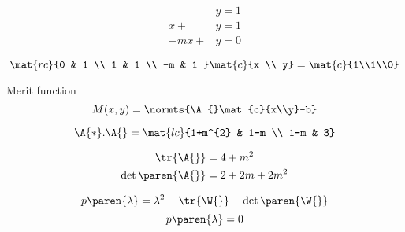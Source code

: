   \begin{equation*}   %
    \begin{split}
      &y = 1 \\
      x + &y = 1 \\
      -mx +&y = 0
    \end{split}
  \end{equation*}

  \begin{equation*}   %
      \mat{rc}{0 & 1 \\ 1 & 1 \\ -m & 1 } 
      \mat{c}{x \\ y} = 
      \mat{c}{1\\1\\0}
  \end{equation*}

Merit function
  \begin{equation*}   %
      M(x,y) = \normts{\A{}\mat{c}{x\\y}-b}
  \end{equation*}

  \begin{equation*}   %
      \A{*}.\A{} = 
      \mat{lc}{1+m^{2} & 1-m \\ 1-m & 3}
  \end{equation*}

  \begin{equation*}   %
    \begin{split}
      \tr {\A{}} &= 4 + m^{2} \\
      \det \paren{\A{}} &= 2 + 2m + 2m^{2}
    \end{split}
  \end{equation*}

  \begin{equation*}   %
      p\paren{\lambda} = \lambda^{2} - \tr{\W{}} + \det\paren{\W{}}
  \end{equation*}
  \begin{equation*}   %
      p\paren{\lambda} = 0
  \end{equation*}


